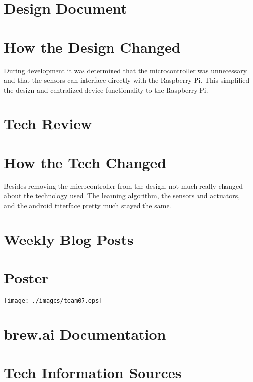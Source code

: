 \documentclass[draftclsnofoot,onecolumn,letterpaper,10pt]{IEEEtran}
\begin{document}
\section{Design Document}


\section{How the Design Changed}

During development it was determined that the microcontroller was unnecessary and that the sensors can interface directly with the Raspberry Pi.
This simplified the design and centralized device functionality to the Raspberry Pi.

\section{Tech Review}


\section{How the Tech Changed}
Besides removing the microcontroller from the design, not much really changed about the technology used.
The learning algorithm, the sensors and actuators, and the android interface pretty much stayed the same.

\section{Weekly Blog Posts}



\section{Poster}
\newpage
\vfill
\begin{sidewaysfigure}[ht]
\texttt{[image: ./images/team07.eps]}
\end{sidewaysfigure}
\vfill
\clearpage


\section{brew.ai Documentation}

\section{Tech Information Sources}
\end{document}
